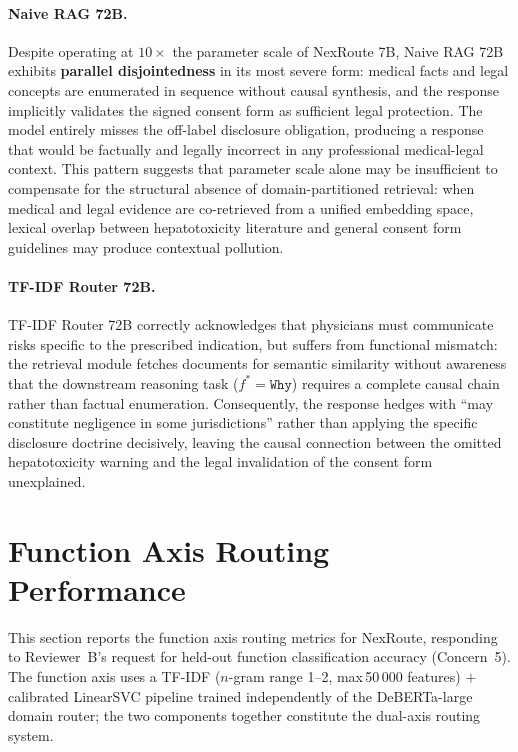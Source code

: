\documentclass[a4paper,fleql,doubleblind]{cas-sc}
\begin{document}
\paragraph{Naive RAG 72B.}
Despite operating at $10\times$ the parameter scale of NexRoute 7B, Naive RAG
72B exhibits \textbf{parallel disjointedness} in its most severe form: medical
facts and legal concepts are enumerated in sequence without causal synthesis,
and the response implicitly validates the signed consent form as sufficient
legal protection. The model entirely misses the off-label disclosure
obligation, producing a response that would be factually and legally incorrect
in any professional medical-legal context. This pattern suggests that parameter
scale alone may be insufficient to compensate for the structural absence of
domain-partitioned retrieval: when medical and legal evidence are co-retrieved
from a unified embedding space, lexical overlap between hepatotoxicity
literature and general consent form guidelines may produce contextual
pollution.

\paragraph{TF-IDF Router 72B.}
TF-IDF Router 72B correctly acknowledges that physicians must communicate
risks specific to the prescribed indication, but suffers from functional
mismatch: the retrieval module fetches documents for semantic similarity
without awareness that the downstream reasoning task ($f^* = \texttt{Why}$)
requires a complete causal chain rather than factual enumeration.
Consequently, the response hedges with ``may constitute negligence in some
jurisdictions'' rather than applying the specific disclosure doctrine
decisively, leaving the causal connection between the omitted hepatotoxicity
warning and the legal invalidation of the consent form unexplained.

\section{Function Axis Routing Performance}
\label{supp:function_axis}

This section reports the function axis routing metrics for NexRoute,
responding to Reviewer~B's request for held-out function classification accuracy
(Concern~5). The function axis uses a TF-IDF ($n$-gram range 1--2,
max\,50\,000 features) $+$ calibrated LinearSVC pipeline trained independently
of the DeBERTa-large domain router; the two components together constitute the
dual-axis routing system.
\end{document}
